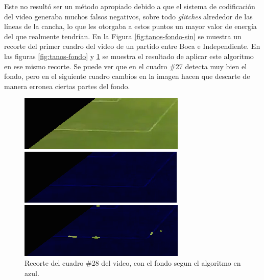 Este no resultó ser un método apropiado debido a que el sistema de codificación
del video generaba muchos falsos negativos, sobre todo \textit{glitches}
alrededor de las líneas de la cancha, lo que les otorgaba a estos puntos un
mayor valor de energía del que realmente tendrían. En la Figura \ref{fig:tanos-fondo-sin}
se muestra un recorte del primer cuadro del video de un partido entre Boca e Independiente.
En las figuras \ref{fig:tanos-fondo} y \ref{fig:tanos-fondo-broken} se muestra el
resultado de aplicar este algoritmo en ese mismo recorte. Se puede ver que en el cuadro
\#27 detecta muy bien el fondo, pero en el siguiente cuadro cambios en la imagen
hacen que descarte de manera erronea ciertas partes del fondo.

\begin{figure}[H]
  \centering
    \begin{minipage}[t]{.45\textwidth}
      \includegraphics[width=\linewidth]{./images/tanos-fondo-f1.png}
      \caption{Recorte del cuadro \#1 del video de un partido entre Boca e Independiente
      \label{fig:tanos-fondo-sin}}
    \end{minipage}
    \begin{minipage}[t]{.45\textwidth}
      \includegraphics[width=\linewidth]{./images/tanos-fondo-f27.png}
      \caption{Recorte del cuadro \#27 del video, con el fondo segun el algoritmo en azul.
      \label{fig:tanos-fondo}}
    \end{minipage}
    \begin{minipage}[t]{.45\textwidth}
      \centering
      \includegraphics[width=\linewidth]{./images/tanos-fondo-f28.png}
      \caption{Recorte del cuadro \#28 del video, con el fondo segun el algoritmo en azul.
      \label{fig:tanos-fondo-broken}}
    \end{minipage}
\end{figure}

